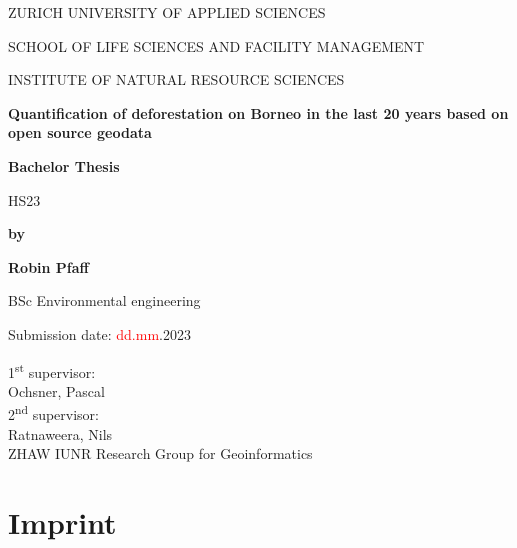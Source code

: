 \documentclass[
]{article}
\author{}
\date{}
\begin{document}
\ifdefined\Shaded\renewenvironment{Shaded}{\begin{tcolorbox}[boxrule=0pt, breakable, borderline west={3pt}{0pt}{shadecolor}, sharp corners, interior hidden, enhanced, frame hidden]}{\end{tcolorbox}}\fi

\begin{titlepage}
    \centering
    {\fontsize{12}{10}\selectfont ZURICH UNIVERSITY OF APPLIED SCIENCES\par}
    {\fontsize{12}{10}\selectfont SCHOOL OF LIFE SCIENCES AND FACILITY MANAGEMENT\par}
    {\fontsize{12}{10}\selectfont INSTITUTE OF NATURAL RESOURCE SCIENCES\par}
    \vspace{6cm}
    {\fontsize{14}{16}\bfseries Quantification of deforestation on Borneo in the last 20 years based on open source geodata\par}
    {\fontsize{12}{14}\bfseries Bachelor Thesis\par}
    {\fontsize{12}{14}\selectfont HS23\par}
    \vspace{2cm}
    {\fontsize{12}{14}\bfseries by\par}
    {\fontsize{12}{14}\bfseries Robin Pfaff\par}
    {\fontsize{12}{14}\selectfont BSc Environmental engineering\par}
    \vspace{2cm}
    {\fontsize{12}{14}\selectfont Submission date: \textcolor{red}{dd.mm}.2023\par}

    \vfill
    \begin{flushleft}
        1\textsuperscript{st} supervisor:\\
        Ochsner, Pascal\\
        2\textsuperscript{nd} supervisor:\\
        Ratnaweera, Nils\\
        ZHAW IUNR Research Group for Geoinformatics
    \end{flushleft}
\end{titlepage}

\newpage

\thispagestyle{empty}
\vspace*{\fill}

\hypertarget{imprint}{%
\section*{Imprint}\label{imprint}}
\end{document}
